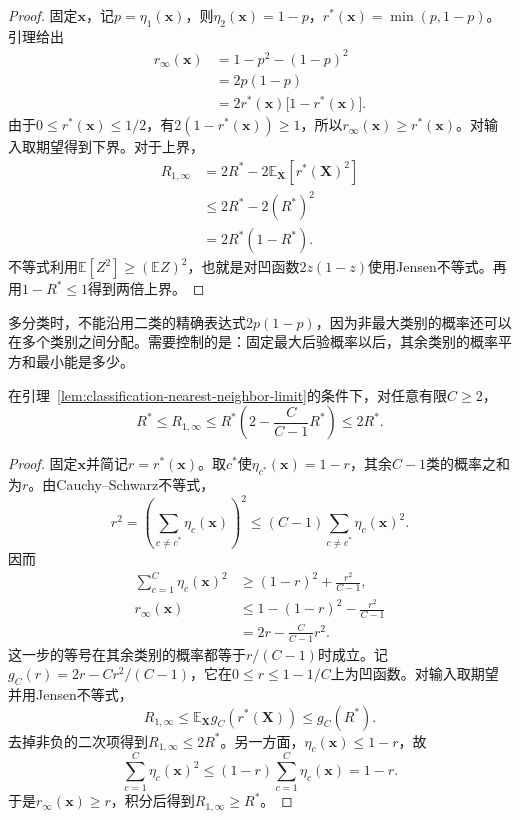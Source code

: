 \begin{proof}
  固定$\bm{x}$，记$p=\eta_1(\bm{x})$，则$\eta_2(\bm{x})=1-p$，$r^\ast(\bm{x})=\min(p,1-p)$。引理给出
  \begin{align*}
    r_\infty(\bm{x})
    &=1-p^2-(1-p)^2\\
    &=2p(1-p)\\
    &=2r^\ast(\bm{x})\bigl[1-r^\ast(\bm{x})\bigr].
  \end{align*}
  由于$0\leq r^\ast(\bm{x})\leq1/2$，有$2(1-r^\ast(\bm{x}))\geq1$，所以$r_\infty(\bm{x})\geq r^\ast(\bm{x})$。对输入取期望得到下界。对于上界，
  \begin{align*}
    R_{1,\infty}
    &=2R^\ast-2\mathbb{E}_{\bm{X}}[r^\ast(\bm{X})^2]\\
    &\leq2R^\ast-2(R^\ast)^2\\
    &=2R^\ast(1-R^\ast).
  \end{align*}
  不等式利用$\mathbb{E}[Z^2]\geq(\mathbb{E}Z)^2$，也就是对凹函数$2z(1-z)$使用Jensen不等式。再用$1-R^\ast\leq1$得到两倍上界。
\end{proof}

多分类时，不能沿用二类的精确表达式$2p(1-p)$，因为非最大类别的概率还可以在多个类别之间分配。需要控制的是：固定最大后验概率以后，其余类别的概率平方和最小能是多少。

\begin{theorem}
  \label{thm:classification-cover-hart-multiclass}
  在引理~\ref{lem:classification-nearest-neighbor-limit}的条件下，对任意有限$C\geq2$，
  \begin{equation}
    R^\ast\leq R_{1,\infty}
    \leq R^\ast\left(2-\frac{C}{C-1}R^\ast\right)
    \leq2R^\ast.
    \label{eq:classification-cover-hart-multiclass}
  \end{equation}
\end{theorem}

\begin{proof}
  固定$\bm{x}$并简记$r=r^\ast(\bm{x})$。取$c^\ast$使$\eta_{c^\ast}(\bm{x})=1-r$，其余$C-1$类的概率之和为$r$。由Cauchy--Schwarz不等式，
  \[
    r^2
    =\left(\sum_{c\neq c^\ast}\eta_c(\bm{x})\right)^2
    \leq(C-1)\sum_{c\neq c^\ast}\eta_c(\bm{x})^2.
  \]
  因而
  \begin{align*}
    \sum_{c=1}^{C}\eta_c(\bm{x})^2
    &\geq(1-r)^2+\frac{r^2}{C-1},\\
    r_\infty(\bm{x})
    &\leq1-(1-r)^2-\frac{r^2}{C-1}\\
    &=2r-\frac{C}{C-1}r^2.
  \end{align*}
  这一步的等号在其余类别的概率都等于$r/(C-1)$时成立。记$g_C(r)=2r-Cr^2/(C-1)$，它在$0\leq r\leq1-1/C$上为凹函数。对输入取期望并用Jensen不等式，
  \[
    R_{1,\infty}
    \leq\mathbb{E}_{\bm{X}}g_C(r^\ast(\bm{X}))
    \leq g_C(R^\ast).
  \]
  去掉非负的二次项得到$R_{1,\infty}\leq2R^\ast$。另一方面，$\eta_c(\bm{x})\leq1-r$，故
  \[
    \sum_{c=1}^{C}\eta_c(\bm{x})^2
    \leq(1-r)\sum_{c=1}^{C}\eta_c(\bm{x})=1-r.
  \]
  于是$r_\infty(\bm{x})\geq r$，积分后得到$R_{1,\infty}\geq R^\ast$。
\end{proof}

